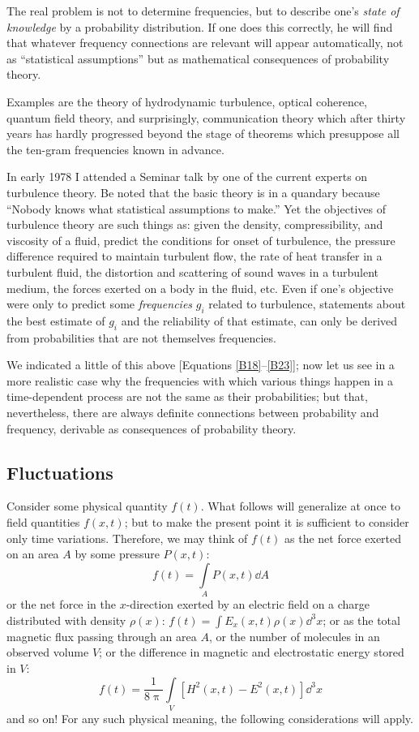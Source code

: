 The real problem is not to determine frequencies, but to describe one's \emph{state of knowledge} by a probability distribution.
If one does this correctly, he will find that whatever frequency connections are relevant will appear automatically, not as ``statistical assumptions'' but as mathematical consequences of probability theory.

Examples are the theory of hydrodynamic turbulence, optical coherence, quantum field theory, and surprisingly, communication theory which after thirty years has hardly progressed beyond the stage of theorems which presuppose all the ten-gram frequencies known in advance.

In early 1978 I attended a Seminar talk by one of the current experts on turbulence theory.
Be noted that the basic theory is in a quandary because ``Nobody knows what statistical assumptions to make.''
Yet the objectives of turbulence theory are such things as: given the density, compressibility, and viscosity of a fluid, predict the conditions for onset of turbulence, the pressure difference required to maintain turbulent flow, the rate of heat transfer in a turbulent fluid, the distortion and scattering of sound waves in a turbulent medium, the forces exerted on a body in the fluid, etc.
Even if one's objective were only to predict some \emph{frequencies} $g_i$ related to turbulence, statements about the best estimate of $g_i$ and the reliability of that estimate, can only be derived from probabilities that are not themselves frequencies.

We indicated a little of this above [Equations \eqref{B18}--\eqref{B23}]; now let us see in a more realistic case why the frequencies with which various things happen in a time-dependent process are not the same as their probabilities; but that, nevertheless, there are always definite connections between probability and frequency, derivable as consequences of probability theory.

\subsection{Fluctuations}
Consider some physical quantity $f(t)$.
What follows will generalize at once to field quantities $f(x,t)$; but to make the present point it is sufficient to consider only time variations.
Therefore, we may think of $f(t)$ as the net force exerted on an area $A$ by some pressure $P(x,t)$:
\begin{equation}
	\label{C1}
	f(t) = \int\limits_{A} P(x, t) \dd A
\end{equation}
or the net force in the $x$-direction exerted by an electric field on a charge distributed with density $\rho(x)$:  $f(t) = \int E_x(x, t) \rho(x) \dd^3 x$; or as the total magnetic flux passing through an area $A$, or the number of molecules in an observed volume $V$; or the difference in magnetic and electrostatic energy stored in $V$:
\begin{equation}
	f(t) = \frac{1}{8\uppi} \int\limits_{V}[H^2(x, t) - E^2(x, t)] \dd^3 x
\end{equation}
and so on! For any such physical meaning, the following considerations will apply.


